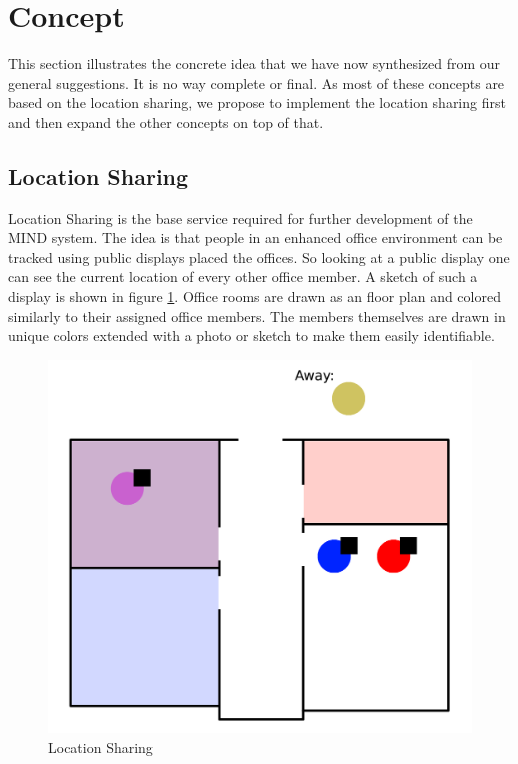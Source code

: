\section{Concept}

This section illustrates the concrete idea that we have now synthesized from our general suggestions.
It is no way complete or final.
As most of these concepts are based on the location sharing, we propose to implement the location sharing first and then expand the other concepts on top of that.

\subsection{Location Sharing}
\label{location_sharing}
Location Sharing is the base service required for further development of the MIND system.
The idea is that people in an enhanced office environment can be tracked using public displays placed the offices.
So looking at a public display one can see the current location of every other office member.
A sketch of such a display is shown in figure \ref{fig:location_sharing}.
Office rooms are drawn as an floor plan and colored similarly to their assigned office members.
The members themselves are drawn in unique colors extended with a photo or sketch to make them easily identifiable.

\begin{figure}
	\centering
	\includegraphics[width=\linewidth]{img/location_sharing}
	\caption[Location Sharing]{Location Sharing}
	\label{fig:location_sharing}
\end{figure}

